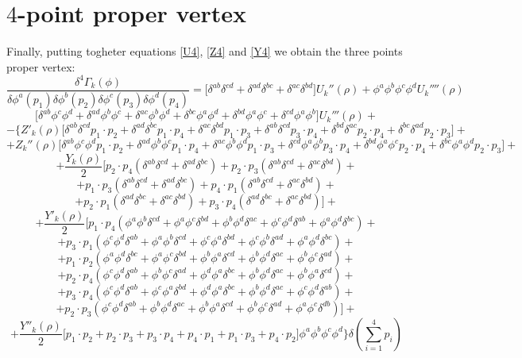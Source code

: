\section{$4$-point proper vertex}
Finally, putting togheter equations \eqref{U4}, \eqref{Z4} and \eqref{Y4}  we obtain the three points proper vertex:
\begin{equation}
\frac{\delta^4 \Gamma_k(\phi)}{\delta \phi^a(p_1)\delta \phi^b(p_2)\delta \phi^c(p_3)\delta \phi^d(p_4)} = \Big[ \delta^{ab}\delta^{cd} + \delta^{ad}\delta^{bc} + \delta^{ac}\delta^{bd}\Big]U_k''(\rho) + \phi^a\phi^b\phi^c\phi^dU_k''''(\rho) 
\end{equation}
$$\Big[\delta^{ab} \phi^c\phi^d + \delta^{ad}\phi^b\phi^c +\delta^{ac}\phi^b\phi^d +\delta^{bc}\phi^a\phi^d +\delta^{bd}\phi^a\phi^c +\delta^{cd}\phi^a\phi^b\Big]U_k'''(\rho) + $$
$$ - \Bigg\{Z'_k(\rho)\Big[\delta^{ab}\delta^{cd}p_1\cdot p_2 + \delta^{ad}\delta^{bc}p_1\cdot p_4 + \delta^{ac}\delta^{bd}p_1\cdot p_3 + \delta^{ab}\delta^{cd}p_3\cdot p_4 + \delta^{bd}\delta^{ac}p_2\cdot p_4 + \delta^{bc}\delta^{ad}p_2\cdot p_3\Big] +$$
$$ + Z_k''(\rho) \Big[\delta^{ab}\phi^c\phi^dp_1\cdot p_2 + \delta^{ad}\phi^b\phi^c p_1\cdot p_4+ \delta^{ac}\phi^b\phi^dp_1\cdot p_3 + \delta^{cd}\phi^a\phi^b p_3\cdot p_4 + \delta^{bd}\phi^a\phi^cp_2\cdot p_4 + \delta^{bc}\phi^a\phi^dp_2\cdot p_3\Big]+$$
$$+\frac{Y_k(\rho)}{2}\Big[p_2\cdot p_4 (\delta^{ab}\delta^{cd}+\delta^{ad}\delta^{bc}) + p_2\cdot p_3(\delta^{ab}\delta^{cd}+ \delta^{ac}\delta^{bd}) +$$
$$+p_1\cdot p_3(\delta^{ab}\delta^{cd}+ \delta^{ad}\delta^{bc}) + p_4\cdot p_1(\delta^{ab}\delta^{cd} + \delta^{ac}\delta^{bd}) +$$
$$+p_2\cdot p_1(\delta^{ad}\delta^{bc} + \delta^{ac}\delta^{bd}) + p_3\cdot p_4(\delta^{ad}\delta^{bc} + \delta^{ac}\delta^{bd})\Big]+$$
$$+ \frac{Y'_k(\rho)}{2}\Big[p_1 \cdot p_4 (\phi^a\phi^b\delta^{cd} + \phi^a\phi^c\delta^{bd} + \phi^b\phi^d\delta^{ac} + \phi^c\phi^d\delta^{ab} + \phi^a\phi^d\delta^{bc}) + $$
$$+ p_3 \cdot p_1 (\phi^c\phi^d\delta^{ab} + \phi^a\phi^b\delta^{cd} + \phi^c\phi^a\delta^{bd} + \phi^c\phi^b\delta^{ad} + \phi^a\phi^d\delta^{bc}) + $$
$$+ p_1 \cdot p_2 (\phi^a\phi^d\delta^{bc} + \phi^a\phi^c\delta^{bd} + \phi^b\phi^a\delta^{cd} + \phi^b\phi^d\delta^{ac} + \phi^b\phi^c\delta^{ad}) + $$
$$+ p_2 \cdot p_4 (\phi^c\phi^d\delta^{ab} + \phi^b\phi^c\delta^{ad} +  \phi^d\phi^a\delta^{bc} + \phi^b\phi^d\delta^{ac} +\phi^b\phi^a\delta^{cd}) + $$
$$+ p_3 \cdot p_4 (\phi^c\phi^d\delta^{ab} + \phi^c\phi^a\delta^{bd} + \phi^d\phi^a\delta^{bc} + \phi^b\phi^d\delta^{ac} + \phi^c\phi^d\delta^{ab}) + $$
$$+ p_2 \cdot p_3 (\phi^c\phi^d\delta^{ab} + \phi^b\phi^d\delta^{ac} + \phi^b\phi^a\delta^{cd} + \phi^b\phi^c\delta^{ad} + \phi^a\phi^c\delta^{db})\Big]+$$
$$+ \frac{Y''_k(\rho)}{2}\Big[p_1\cdot p_2 + p_2\cdot p_3 + p_3\cdot p_4 + p_4\cdot p_1 + p_1\cdot p_3 + p_4\cdot p_2 \Big]\phi^a\phi^b\phi^c\phi^d\Bigg\} \delta\left(\sum_{i=1}^4 p_i\right)$$
